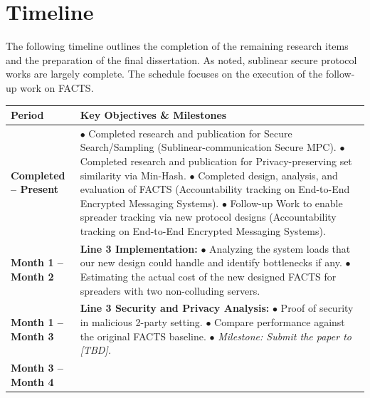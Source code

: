 \section{Timeline}

The following timeline outlines the completion of the remaining research items and the preparation of the final dissertation. As noted, sublinear secure protocol works are largely complete. The schedule focuses on the execution of the follow-up work on FACTS.

\begin{table}[H]
    \centering
    \renewcommand{\arraystretch}{1.5}
    \begin{tabular}{|p{}|p{}|}
        \hline
        \textbf{Period} & \textbf{Key Objectives \& Milestones} \\
        \hline
        \textbf{Completed -- Present} & 
        $\bullet$ Completed research and publication for Secure Search/Sampling (Sublinear-communication Secure MPC). \newline
        $\bullet$ Completed research and publication for Privacy-preserving set similarity via Min-Hash. \newline
        $\bullet$ Completed design, analysis, and evaluation of FACTS (Accountability tracking on End-to-End Encrypted Messaging Systems). \newline
        $\bullet$ Follow-up Work to enable spreader tracking via new protocol designs (Accountability tracking on End-to-End Encrypted Messaging Systems). \\
        \hline
        \textbf{Month 1 -- Month 2} & 
        \textbf{Line 3 Implementation:} \newline
        $\bullet$ Analyzing the system loads that our new design could handle and identify bottlenecks if any. \newline
        $\bullet$ Estimating the actual cost of the new designed FACTS for spreaders with two non-colluding servers. \\
        \hline
        \textbf{Month 1 -- Month 3} & 
        \textbf{Line 3 Security and Privacy Analysis:} \newline
        $\bullet$ Proof of security in malicious 2-party setting. \newline
        $\bullet$ Compare performance against the original FACTS baseline. \newline
        $\bullet$ \textit{Milestone: Submit the paper to [TBD].} \\
        \hline
        \textbf{Month 3 -- Month 4} & 

\end{tabular}
\end{table}
